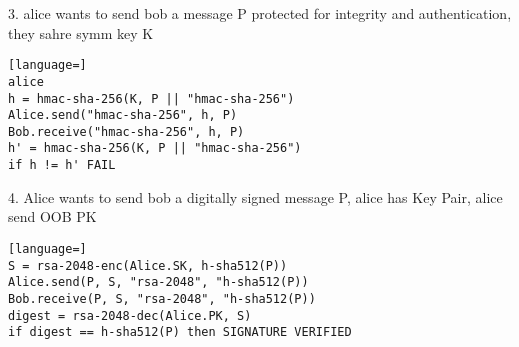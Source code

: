 \documentclass[12pt]{article}
\begin{document}
3. alice wants to send bob a message P protected for integrity and authentication, they sahre symm key K
\begin{lstlisting}[language=]
alice 
h = hmac-sha-256(K, P || "hmac-sha-256")
Alice.send("hmac-sha-256", h, P)
Bob.receive("hmac-sha-256", h, P)
h' = hmac-sha-256(K, P || "hmac-sha-256")
if h != h' FAIL
\end{lstlisting}

4. Alice wants to send bob a digitally signed message P, alice has Key Pair, alice send OOB PK
\begin{lstlisting}[language=]
S = rsa-2048-enc(Alice.SK, h-sha512(P))
Alice.send(P, S, "rsa-2048", "h-sha512(P))
Bob.receive(P, S, "rsa-2048", "h-sha512(P))
digest = rsa-2048-dec(Alice.PK, S)
if digest == h-sha512(P) then SIGNATURE VERIFIED
\end{lstlisting}
\end{document}
